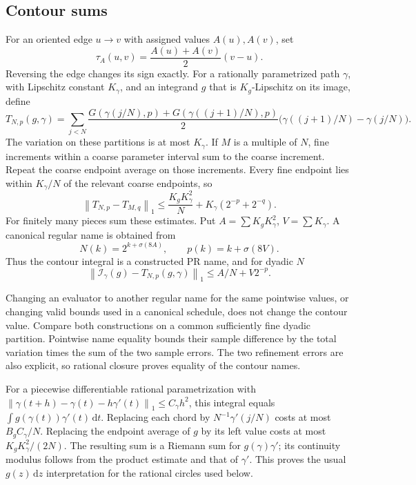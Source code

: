 \documentclass[11pt]{article}
\theoremstyle{definition}
\newcommand{\norm}[1]{\left\lVert#1\right\rVert_1}
\newcommand{\dd}{\,\mathrm d}
\newcommand{\Int}{\mathcal I}
\begin{document}
\subsection{Contour sums}\label{sec:contours}

For an oriented edge \(u\to v\) with assigned values \(A(u),A(v)\), set
\begin{equation}\label{eq:edge}
 \tau_A(u,v)=\frac{A(u)+A(v)}2(v-u).
\end{equation}
Reversing the edge changes its sign exactly.
For a rationally parametrized path \(\gamma\), with Lipschitz constant
\(K_\gamma\), and an integrand \(g\) that is \(K_g\)-Lipschitz on its image,
define
\begin{equation}\label{eq:ctr}
 T_{N,p}(g,\gamma)=\sum_{j<N}
 \frac{G(\gamma(j/N),p)+G(\gamma((j+1)/N),p)}2
       \bigl(\gamma((j+1)/N)-\gamma(j/N)\bigr).
\end{equation}
The variation on these partitions is at most \(K_\gamma\).
If \(M\) is a multiple of \(N\), fine increments within a coarse parameter
interval sum to the coarse increment. Repeat the coarse endpoint average
on those increments. Every fine endpoint lies within \(K_\gamma/N\) of
the relevant coarse endpoints, so
\begin{equation}\label{eq:contourrefine}
 \norm{T_{N,p}-T_{M,q}}\le
   \frac{K_gK_\gamma^2}{N}+K_\gamma(2^{-p}+2^{-q}).
\end{equation}
For finitely many pieces sum these estimates. Put
\(A=\sum K_gK_\gamma^2\), \(V=\sum K_\gamma\).
A canonical regular name is obtained from
\[
 N(k)=2^{k+\sigma(8A)},\qquad p(k)=k+\sigma(8V).
\]
Thus the contour integral is a constructed PR name, and for dyadic \(N\)
\begin{equation}\label{eq:contourerror}
 \norm{\Int_\gamma(g)-T_{N,p}(g,\gamma)}
                  \le A/N+V2^{-p}.
\end{equation}

Changing an evaluator to another regular name for the same pointwise
values, or changing valid bounds used in a canonical schedule, does not
change the contour value. Compare both constructions on a common
sufficiently fine dyadic partition. Pointwise name equality bounds their
sample difference by the total variation times the sum of the two sample
errors. The two refinement errors are also explicit, so rational closure
proves equality of the contour names.

For a piecewise differentiable rational parametrization with
\(\norm{\gamma(t+h)-\gamma(t)-h\gamma'(t)}\le C_\gamma h^2\),
this integral equals \(\int g(\gamma(t))\gamma'(t)\dd t\).
Replacing each chord by \(N^{-1}\gamma'(j/N)\) costs at most
\(B_gC_\gamma/N\). Replacing the endpoint average of \(g\) by its left
value costs at most \(K_gK_\gamma^2/(2N)\).
The resulting sum is a Riemann sum for \(g(\gamma)\gamma'\);
its continuity modulus follows from the product estimate and that of
\(\gamma'\). This proves the usual \(g(z)\dd z\) interpretation for the
rational circles used below.
\end{document}
